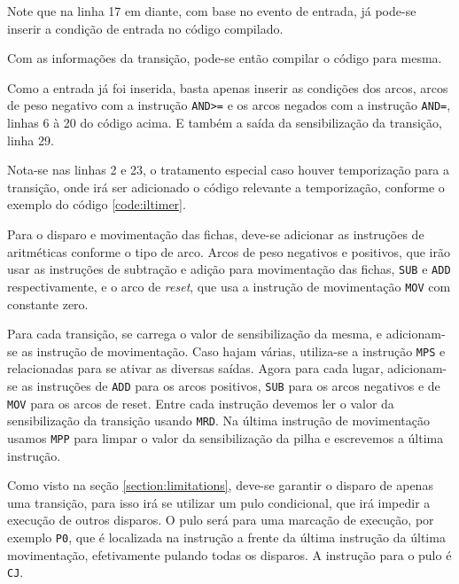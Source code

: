 Note que na linha 17 em diante, com base no evento de entrada, já pode-se inserir a condição de entrada no código compilado.

Com as informações da transição, pode-se então compilar o código para mesma.



Como a entrada já foi inserida, basta apenas inserir as condições dos arcos, arcos de peso negativo com a instrução \lstinline{AND>=} e os arcos negados com a instrução \lstinline{AND=}, linhas 6 à 20 do código acima. E também a saída da sensibilização da transição, linha 29.

Nota-se nas linhas 2 e 23, o tratamento especial caso houver temporização para a transição, onde irá ser adicionado o código relevante a temporização, conforme o exemplo do código \ref{code:iltimer}.

Para o disparo e movimentação das fichas, deve-se adicionar as instruções de aritméticas conforme o tipo de arco. Arcos de peso negativos e positivos, que irão usar as instruções de subtração e adição para movimentação das fichas, \lstinline{SUB} e \lstinline{ADD} respectivamente, e o arco de \textit{reset}, que usa a instrução de movimentação \lstinline{MOV} com constante zero.

Para cada transição, se carrega o valor de sensibilização da mesma, e adicionam-se as instrução de movimentação. Caso hajam várias, utiliza-se a instrução \lstinline{MPS} e relacionadas para se ativar as diversas saídas. Agora para cada lugar, adicionam-se as instruções de \lstinline{ADD} para os arcos positivos, \lstinline{SUB} para os arcos negativos e de \lstinline{MOV} para os arcos de reset. Entre cada instrução devemos ler o valor da sensibilização da transição usando \lstinline{MRD}. Na última instrução de movimentação usamos \lstinline{MPP} para limpar o valor da sensibilização da pilha e escrevemos a última instrução.

Como visto na seção \ref{section:limitations}, deve-se garantir o disparo de apenas uma transição, para isso irá se utilizar um pulo condicional, que irá impedir a execução de outros disparos. O pulo será para uma marcação de execução, por exemplo \lstinline{P0}, que é localizada na instrução a frente da última instrução da última movimentação, efetivamente pulando todas os disparos. A instrução para o pulo é \lstinline{CJ}.  

